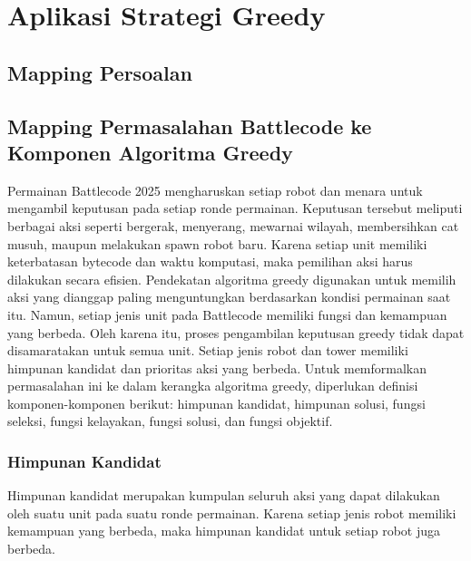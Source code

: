\documentclass{article}
\begin{document}
\section{Aplikasi Strategi Greedy}

\subsection{Mapping Persoalan}

\subsection{Mapping Permasalahan Battlecode ke Komponen Algoritma Greedy}

Permainan Battlecode 2025 mengharuskan setiap robot dan menara untuk mengambil keputusan pada setiap ronde permainan. Keputusan tersebut meliputi berbagai aksi seperti bergerak, menyerang, mewarnai wilayah, membersihkan cat musuh, maupun melakukan spawn robot baru. Karena setiap unit memiliki keterbatasan bytecode dan waktu komputasi, maka pemilihan aksi harus dilakukan secara efisien.
Pendekatan algoritma greedy digunakan untuk memilih aksi yang dianggap paling menguntungkan berdasarkan kondisi permainan saat itu. Namun, setiap jenis unit pada Battlecode memiliki fungsi dan kemampuan yang berbeda. Oleh karena itu, proses pengambilan keputusan greedy tidak dapat disamaratakan untuk semua unit. Setiap jenis robot dan tower memiliki himpunan kandidat dan prioritas aksi yang berbeda.
Untuk memformalkan permasalahan ini ke dalam kerangka algoritma greedy, diperlukan definisi komponen-komponen berikut: himpunan kandidat, himpunan solusi, fungsi seleksi, fungsi kelayakan, fungsi solusi, dan fungsi objektif.

\subsubsection{Himpunan Kandidat}

Himpunan kandidat merupakan kumpulan seluruh aksi yang dapat dilakukan oleh suatu unit pada suatu ronde permainan. Karena setiap jenis robot memiliki kemampuan yang berbeda, maka himpunan kandidat untuk setiap robot juga berbeda.
\end{document}
